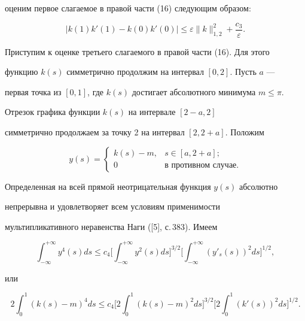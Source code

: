 \begin{pf}
оценим первое слагаемое в правой части (16) следующим образом:


$$


| {k(1) {k}'(1) -k(0) {k}'(0)}| \le \varepsilon


\| {k}\|_{1,2}^2+\frac{c_3}{\varepsilon}.


$$





Приступим к оценке третьего слагаемого в правой части (16). Для этого


функцию $k(s)$ симметрично продолжим на интервал $[0,2]$. Пусть $a$ ---


первая точка из $[0,1]$, где $k(s)$ достигает абсолютного минимума $m\le\pi$.


Отрезок графика функции $k(s)$ на интервале $[2-a,2]$


симметрично продолжаем за точку 2 на интервал $[2,2+a]$. Положим


$$


y(s)=


\begin{cases}


k(s)-m, & s \in [a, 2+a]; \\


0 & \text{в противном случае}.


\end{cases}


$$


Определенная на всей прямой неотрицательная функция $y(s)$ абсолютно


непрерывна и удовлетворяет всем условиям применимости


мультипликативного неравенства Наги ([5], с.\,383). Имеем


$$


\int_{-\infty}^{+\infty}y^{4}(s) ds \le c_4 \bigg[\int_{-\infty}^{+\infty}


y^2(s) ds \bigg]^{3/2}\bigg[\int_{-\infty}^{+\infty}(y'_s(s))^2ds


\bigg]^{1/2},


$$


или


\begin{equation}


2 \int_{0}^{1}(k(s)-m)^4 ds \le c_4 \bigg[2\int_{0}^{1}(k(s)-m)^2 ds


\bigg]^{3/2} \bigg[2\int_{0}^{1}(k'(s))^2 ds \bigg]^{1/2}.


\end{equation}



\end{pf}
